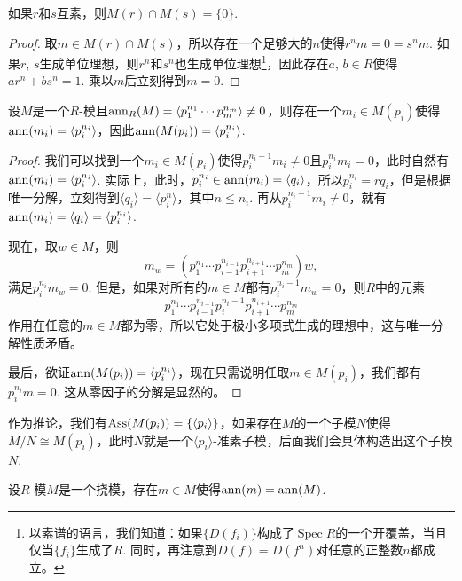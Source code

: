 \begin{lem}
    如果$r$和$s$互素，则$M(r)\cap M(s)=\{0\}$.
\end{lem}

\begin{proof}
    取$m\in M(r)\cap M(s)$，所以存在一个足够大的$n$使得$r^nm=0=s^nm$. 如果$r$, $s$生成单位理想，则$r^{n}$和$s^{n}$也生成单位理想\footnote{以素谱的语言，我们知道：如果$\{D(f_i)\}$构成了$\operatorname{Spec} R$的一个开覆盖，当且仅当$\{f_i\}$生成了$R$. 同时，再注意到$D(f)=D(f^n)$对任意的正整数$n$都成立。}，因此存在$a$, $b\in R$使得$ar^{n}+bs^{n}=1$. 乘以$m$后立刻得到$m=0$.
\end{proof}

\begin{lem}
    设$M$是一个$R$-模且$\operatorname{ann}_R(M)=\langle p_1^{n_1}\cdots p_m^{n_m}\rangle \neq 0$，则存在一个$m_i\in M(p_i)$使得$\operatorname{ann}(m_i)=\langle p_i^{n_i}\rangle$，因此$\operatorname{ann}(M(p_i))=\langle p_i^{n_i}\rangle$.
\end{lem}

\begin{proof}
    我们可以找到一个$m_i\in M(p_i)$使得$p_i^{n_i-1}m_i\neq 0$且$p_i^{n_i}m_i=0$，此时自然有$\operatorname{ann}(m_i)=\langle p_i^{n_i}\rangle$. 实际上，此时，$p_i^{n_i}\in \operatorname{ann}(m_i)=\langle q_i\rangle$，所以$p_i^{n_i}=rq_i$，但是根据唯一分解，立刻得到$\langle q_i\rangle=\langle p_i^n\rangle$，其中$n\leq n_i$. 再从$p_i^{n_i-1}m_i\neq 0$，就有$\operatorname{ann}(m_i)=\langle q_i\rangle = \langle p_i^{n_i}\rangle$.
    
    现在，取$w\in M$，则
    \[
        m_w=\left(p_1^{n_1}\cdots p_{i-1}^{n_{i-1}}p_{i+1}^{n_{i+1}}\cdots p_{m}^{n_{m}}\right)w,
    \]
    满足$p_i^{n_i}m_w=0$. 但是，如果对所有的$m\in M$都有$p_i^{n_i-1}m_w=0$，则$R$中的元素
    \[
        p_1^{n_1}\cdots p_{i-1}^{n_{i-1}}p_i^{n_i-1}p_{i+1}^{n_{i+1}}\cdots p_{m}^{n_{m}}
    \]
    作用在任意的$m\in M$都为零，所以它处于极小多项式生成的理想中，这与唯一分解性质矛盾。

    最后，欲证$\operatorname{ann}(M(p_i))=\langle p_i^{n_i}\rangle$，现在只需说明任取$m\in M(p_i)$，我们都有$p_i^{n_i}m=0$. 这从零因子的分解是显然的。
\end{proof}

作为推论，我们有$\operatorname{Ass}(M(p_i))=\{\langle p_i\rangle\}$，如果存在$M$的一个子模$N$使得$M/N\cong M(p_i)$，此时$N$就是一个$\langle p_i\rangle$-准素子模，后面我们会具体构造出这个子模$N$.

\begin{pro}\label{pro:6.3.6}
    设$R$-模$M$是一个挠模，存在$m\in M$使得$\operatorname{ann}(m)=\operatorname{ann}(M)$.
\end{pro}

